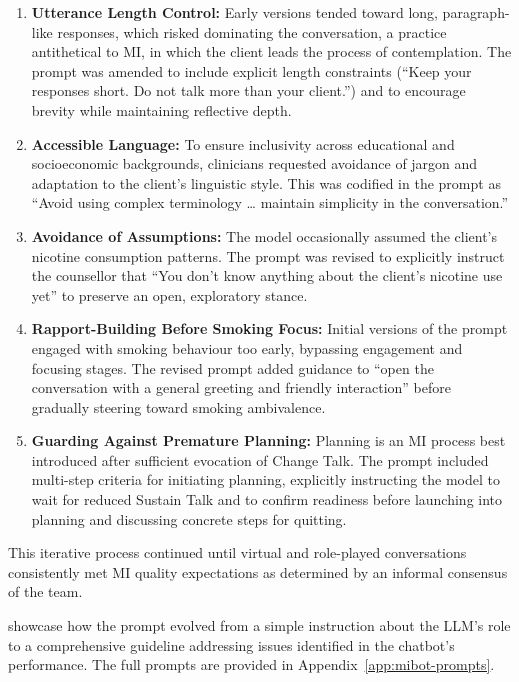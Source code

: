 \begin{enumerate}
    \item \textbf{Utterance Length Control:} Early versions tended toward long, paragraph-like responses, which risked dominating the conversation, a practice antithetical to MI, in which the client leads the process of contemplation. The prompt was amended to include explicit length constraints (``Keep your responses short. Do not talk more than your client.'') and to encourage brevity while maintaining reflective depth.

    \item \textbf{Accessible Language:} To ensure inclusivity across educational and socioeconomic backgrounds, clinicians requested avoidance of jargon and adaptation to the client's linguistic style. This was codified in the prompt as ``Avoid using complex terminology … maintain simplicity in the conversation.''

    \item \textbf{Avoidance of Assumptions:} The model occasionally assumed the client's nicotine consumption patterns. The prompt was revised to explicitly instruct the counsellor that ``You don't know anything about the client's nicotine use yet'' to preserve an open, exploratory stance.

    \item \textbf{Rapport-Building Before Smoking Focus:} Initial versions of the prompt engaged with smoking behaviour too early, bypassing engagement and focusing stages. The revised prompt added guidance to ``open the conversation with a general greeting and friendly interaction'' before gradually steering toward smoking ambivalence.

    \item \textbf{Guarding Against Premature Planning:} Planning is an MI process best introduced after sufficient evocation of Change Talk. The prompt included multi-step criteria for initiating planning, explicitly instructing the model to wait for reduced Sustain Talk and to confirm readiness before launching into planning and discussing concrete steps for quitting.

    
\end{enumerate}



This iterative process continued until virtual and role-played conversations consistently met MI quality expectations as determined by an informal consensus of the team.


 showcase how the prompt evolved from a simple instruction about the LLM's role to a comprehensive guideline addressing issues identified in the chatbot's performance. The full prompts are provided in Appendix~\ref{app:mibot-prompts}.


